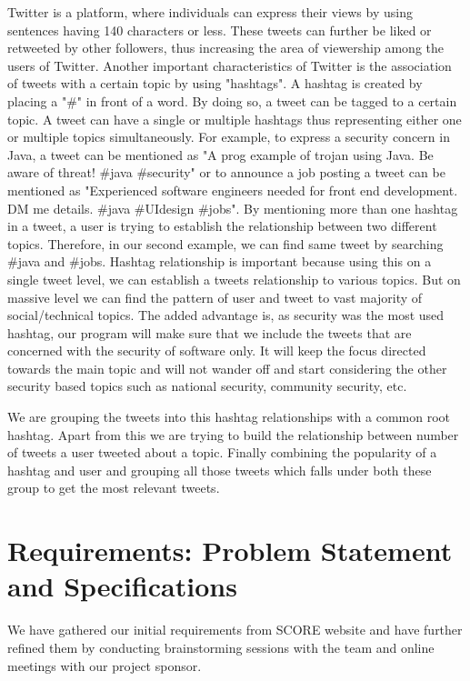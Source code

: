 \documentclass[11pt]{article}
\begin{document}
Twitter is a platform, where individuals can express their views by using sentences having 140 characters or less. These tweets can further be liked or retweeted by other followers, thus increasing the area of viewership among the users of Twitter. Another important characteristics of Twitter is the association of tweets with a certain topic by using "hashtags". A hashtag is created by placing a "\#" in front of a word. By doing so, a tweet can be tagged to a certain topic. A tweet can have a single or multiple hashtags thus representing either one or multiple topics simultaneously. For example, to express a security concern in Java, a tweet can be mentioned as "A prog example of trojan using Java. Be aware of threat! \#java \#security" or to announce a job posting a tweet can be mentioned as "Experienced software engineers needed for front end development. DM me details. \#java \#UIdesign \#jobs". By mentioning more than one hashtag in a tweet, a user is trying to establish the relationship between two different topics. Therefore, in our second example, we can find same tweet by searching \#java and \#jobs. Hashtag relationship is important because using this on a single tweet level, we can establish a tweets relationship to various topics. But on massive level we can find the pattern of user and tweet to vast majority of social/technical topics. The added advantage is, as security was the most used hashtag, our program will make sure that we include the tweets that are concerned with the security of software only. It will keep the focus directed towards the main topic and will not wander off and start considering the other security based topics such as national security, community security, etc.

We are grouping the tweets into this hashtag relationships with a common root hashtag. Apart from this we are trying to build the relationship between number of tweets a user tweeted about a topic. Finally combining the popularity of a hashtag and user and grouping all those tweets which falls under both these group to get the most relevant tweets.

\section{Requirements: Problem Statement and Specifications}
We have gathered our initial requirements from SCORE website\cite{SCOREwebsite} and have further refined them by conducting brainstorming sessions with the team and online meetings with our project sponsor.
\end{document}
